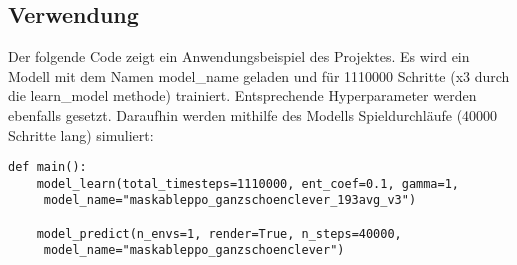 \subsection{Verwendung}
\begin{minipage}{\linewidth}
Der folgende Code zeigt ein Anwendungsbeispiel des Projektes. Es  wird ein Modell mit dem Namen model\_name geladen und für 1110000 Schritte (x3 durch die learn\_model methode) trainiert. Entsprechende Hyperparameter werden ebenfalls gesetzt. Daraufhin werden mithilfe des Modells Spieldurchläufe (40000 Schritte lang) simuliert:
\vspace{0.5cm}
\begin{lstlisting}[caption={Anwendungsbeispiel}]
def main():
	model_learn(total_timesteps=1110000, ent_coef=0.1, gamma=1, 
	 model_name="maskableppo_ganzschoenclever_193avg_v3")
	
	model_predict(n_envs=1, render=True, n_steps=40000,
	 model_name="maskableppo_ganzschoenclever")
\end{lstlisting}
\end{minipage}
